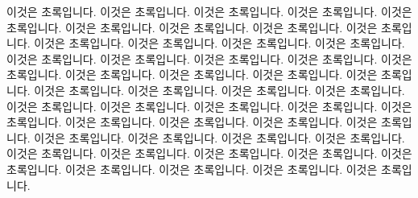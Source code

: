 이것은 초록입니다.
이것은 초록입니다.
이것은 초록입니다.
이것은 초록입니다.
이것은 초록입니다.
이것은 초록입니다.
이것은 초록입니다.
이것은 초록입니다.
이것은 초록입니다.
이것은 초록입니다.
이것은 초록입니다.
이것은 초록입니다.
이것은 초록입니다.
이것은 초록입니다.
이것은 초록입니다.
이것은 초록입니다.
이것은 초록입니다.
이것은 초록입니다.
이것은 초록입니다.
이것은 초록입니다.
이것은 초록입니다.
이것은 초록입니다.
이것은 초록입니다.
이것은 초록입니다.
이것은 초록입니다.
이것은 초록입니다.
이것은 초록입니다.
이것은 초록입니다.
이것은 초록입니다.
이것은 초록입니다.
이것은 초록입니다.
이것은 초록입니다.
이것은 초록입니다.
이것은 초록입니다.
이것은 초록입니다.
이것은 초록입니다.
이것은 초록입니다.
이것은 초록입니다.
이것은 초록입니다.
이것은 초록입니다.
이것은 초록입니다.
이것은 초록입니다.
이것은 초록입니다.
이것은 초록입니다.
이것은 초록입니다.
이것은 초록입니다.
이것은 초록입니다.
이것은 초록입니다.
